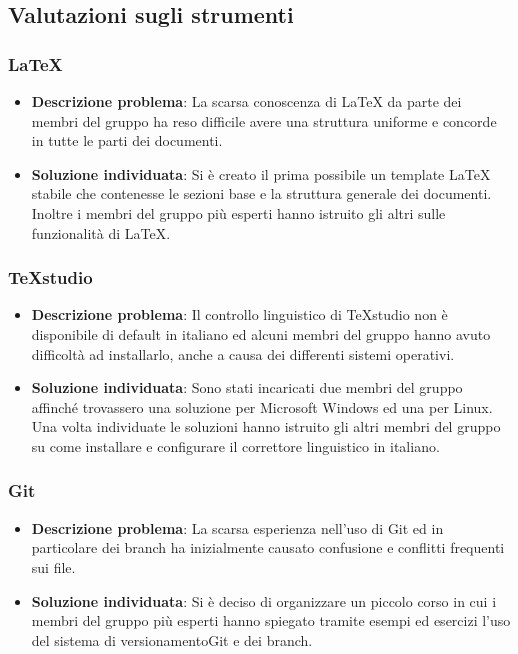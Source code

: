 \subsection{Valutazioni sugli strumenti}
	\subsubsection{\LaTeX}
		\begin{itemize}
			\item \textbf{Descrizione problema}: La scarsa conoscenza di \LaTeX\xspace da parte dei membri del gruppo ha reso difficile avere una struttura uniforme e concorde in tutte le parti dei documenti.
			\item \textbf{Soluzione individuata}: Si è creato il prima possibile un template \LaTeX\xspace stabile che contenesse le sezioni base e la struttura generale dei documenti. Inoltre i membri del gruppo più esperti hanno istruito gli altri sulle funzionalità di \LaTeX.
		\end{itemize}
	\subsubsection{TeXstudio}
		\begin{itemize}
			\item \textbf{Descrizione problema}: Il controllo linguistico di TeXstudio non è disponibile di default in italiano ed alcuni membri del gruppo hanno avuto difficoltà ad installarlo, anche a causa dei differenti sistemi operativi.
			\item \textbf{Soluzione individuata}: Sono stati incaricati due membri del gruppo affinché trovassero una soluzione per Microsoft Windows ed una per Linux. Una volta individuate le soluzioni hanno istruito gli altri membri del gruppo su come installare e configurare il correttore linguistico in italiano.
		\end{itemize}
	\subsubsection{Git}
		\begin{itemize}
			\item \textbf{Descrizione problema}: La scarsa esperienza nell'uso di Git ed in particolare dei branch ha inizialmente causato confusione e conflitti frequenti sui file.
			\item \textbf{Soluzione individuata}: Si è deciso di organizzare un piccolo corso in cui i membri del gruppo più esperti hanno spiegato tramite esempi ed esercizi l'uso del sistema di versionamento\glosp Git e dei branch. 
		\end{itemize}

